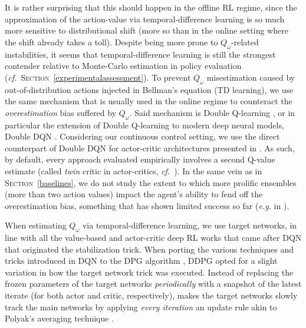 It is rather surprising that this should happen in the offline RL regime, since the approximation of
the action-value via temporal-difference learning is so much more sensitive to distributional shift (more so than
in the online setting where the shift already takes a toll).
Despite being more prone to $Q_\omega$-related instabilities, it seems that
temporal-difference learning is still
the strongest contender relative to Monte-Carlo estimation in policy evaluation
(\textit{cf.}~\textsc{Section}~\ref{experimentalassessment}).
To prevent $Q_\omega$ misestimation caused by out-of-distribution actions injected in Bellman's equation
(TD learning),
we use the same mechanism that is usually used in the online regime
to counteract the \emph{overestimation} bias \cite{Thrun1993-or}
suffered by $Q_\omega$.
Said mechanism is Double Q-learning \cite{Van_Hasselt2010-qk},
or in particular the extension of Double Q-learning
to modern deep neural models, Double DQN \cite{Van_Hasselt2015-uc}.
Considering our continuous control setting, we use the direct counterpart of Double DQN
for actor-critic architectures presented in \cite{Fujimoto2018-pe}.
As such, by default, every approach evaluated empirically
involves a second Q-value estimate (called \textit{twin} critic
in actor-critics, \textit{cf.}~\cite{Fujimoto2018-pe}).
In the same vein as in \textsc{Section}~\ref{baselines}, we do not study the extent to which more prolific ensembles
(more than two action values) impact the agent's ability to fend off the overestimation bias,
something that has shown limited success so far (\textit{e.g.} in \cite{Kumar2019-rw}).

When estimating $Q_\omega$ via temporal-difference learning, we use target networks,
in line with all the value-based and actor-critic deep RL works that came after
DQN \cite{Mnih2013-rb, Mnih2015-iy}
that originated the stabilization trick.
When porting the various techniques and tricks introduced in DQN to the DPG algorithm \cite{Silver2014-dk},
DDPG \cite{Lillicrap2016-xa}
opted for a slight variation in how the target network trick was executed.
Instead of replacing the frozen parameters of the target networks
\emph{periodically} with a snapshot of the latest iterate
(for both actor and critic, respectively), \cite{Lillicrap2016-xa}
makes the target networks slowly track the main networks by applying \emph{every iteration} an update rule
akin to Polyak's averaging technique \cite{Polyak1992-ci}.

